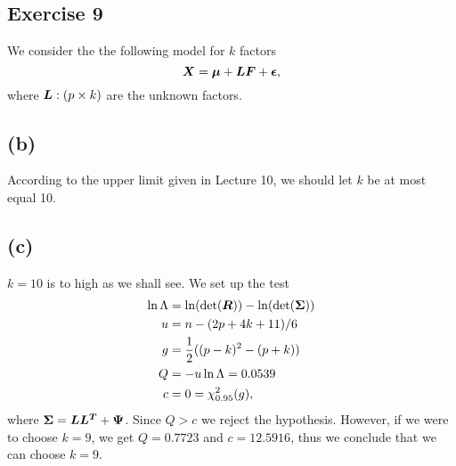 
\subsection*{Exercise 9}
\label{sec:exercise-9}

We consider the the following model for $k$ factors
\begin{equation*}
  \bm{X} = \bm{\mu}  + \bm{LF} + \bm{\epsilon},
\end{equation*}
where $\bm{L}: (p\times k)$ are the unknown factors.

\subsection*{(b)}
\label{sec:b-8}

According to the upper limit given in Lecture 10, we should let $k$ be
at most equal 10.

\subsection*{(c)}
\label{sec:c-8}

$k = 10$ is to high as we shall see. We set up the test
\begin{align*}
  \ln \Lambda &= \ln(\det(\bm{R})) - \ln(\det(\bm{\Sigma})) \\
  u &=  n - (2p+4k+11)/6 \\
  g &= \frac 12 ((p-k)^2 - (p+k)) \\
  Q &= -u \ln \Lambda =   0.0539\\
  c &= 0 = \chi^2_{0.95}(g),
\end{align*}
where $\bm{\Sigma} = \bm{LL^T} + \bm{\Psi}$. Since $Q > c$ we reject the
hypothesis. However, if we were to choose $k=9$, we get $Q = 0.7723$
and $c =  12.5916$, thus we conclude that we can choose $k = 9$.
